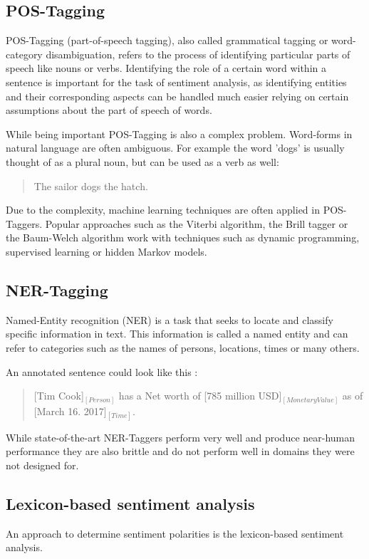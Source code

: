 \documentclass[10pt,a4paper]{article}
\begin{document}
		\subsection{POS-Tagging}		
		POS-Tagging (part-of-speech tagging), also called grammatical tagging or word-category disambiguation, refers to the process of identifying particular parts of speech like nouns or verbs. Identifying the role of a certain word within a sentence is important for the task of sentiment analysis, as identifying entities and their corresponding aspects can be handled much easier relying on certain assumptions about the part of speech of words.
		
		While being important POS-Tagging is also a complex problem. Word-forms in natural language are often ambiguous. For example the word 'dogs' is usually thought of as a plural noun, but can be used as a verb as well:

		\begin{quote}
			The sailor dogs the hatch.
		\end{quote}

		Due to the complexity, machine learning techniques are often applied in POS-Taggers. Popular approaches such as the Viterbi algorithm, the Brill tagger or the Baum-Welch algorithm work with techniques such as dynamic programming, supervised learning or hidden Markov models.
		
		\subsection{NER-Tagging}
		
		Named-Entity recognition (NER) is a task that seeks to locate and classify specific information in text. This information is called a named entity and can refer to categories such as the names of persons, locations, times or many others.

		An annotated sentence could look like this :

		\begin{quote}
			[Tim Cook]$_{[Person]}$ has a Net worth of [785 million USD]$_{[Monetary Value]}$ as of [March 16. 2017]$_{[Time]}$.
		\end{quote}
		
		While state-of-the-art NER-Taggers perform very well and produce near-human performance they are also brittle and do not perform well in domains they were not designed for.
		
		\subsection{Lexicon-based sentiment analysis}
		An approach to determine sentiment polarities is the lexicon-based sentiment analysis.
		
\end{document}

